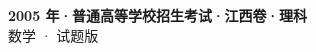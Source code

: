 \documentclass[zihao=-4, a4paper]{ctexart}
\begin{document}
\begin{center}
  {\Large\bfseries 2005 年·普通高等学校招生考试·江西卷·理科}\\[4pt]
  {\large 数学 · 试题版}
\end{center}
\medskip
{}

\end{document}
